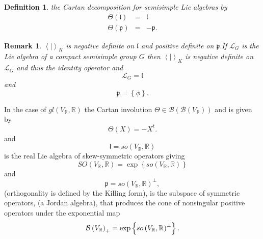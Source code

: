 \documentclass[aps,preprint]{revtex4}
\newtheorem{definition}[theorem]{Definition}
\newtheorem{remark}[theorem]{Remark}
\begin{document}
\begin{definition}
the Cartan decomposition for semisimple Lie algebras by%
\begin{eqnarray}
\Theta \left( \mathfrak{l}\right) &=&\mathfrak{l} \\
\Theta \left( \mathfrak{p}\right) &=&-\mathfrak{p.}
\end{eqnarray}
\end{definition}

\begin{remark}
$\left\langle \left. {}\right\vert \right\rangle _{K}$ is negative definite
on $\mathfrak{l}$ and positive definite on $\mathfrak{p.}$If $\mathcal{L}%
_{G} $ is the Lie algebra of a compact semisimple group $G$ then $%
\left\langle \left. {}\right\vert \right\rangle _{K}$ is negative definite
on $\mathcal{L}_{G}$ and thus the identity operator and 
\begin{equation}
\mathcal{L}_{G}=\mathfrak{l}
\end{equation}%
and 
\begin{equation}
\mathfrak{p}=\left\{ \phi \right\} .
\end{equation}
\end{remark}

In the case of $gl\left( V_{\mathbb{R}},\mathbb{R}\right) $ the Cartan
involution $\Theta \in \mathcal{B}\left( \mathcal{B}\left( V_{\mathbb{R}%
}\right) \right) $ and is given by 
\begin{equation}
\Theta \left( X\right) =-X^{t}.
\end{equation}%
and 
\begin{equation}
\mathfrak{l}=so\left( V_{\mathbb{R}},\mathbb{R}\right)
\end{equation}
is the real Lie algebra of skew-symmetric operators giving 
\begin{equation}
SO\left( V_{\mathbb{R}},\mathbb{R}\right) =\exp \left\{ so\left( V_{\mathbb{R%
}},\mathbb{R}\right) \right\}
\end{equation}%
and%
\begin{equation}
\mathfrak{p}=so\left( V_{\mathbb{R}},\mathbb{R}\right) ^{\bot },
\end{equation}
(orthogonality is defined by the Killing form), is the subspace of symmetric
operators, (a Jordan algebra), that produces the cone of nonsingular
positive operators under the exponential map 
\begin{equation}
\mathcal{B}\left( V_{\mathbb{R}}\right) _{+}=\exp \left\{ so\left( V_{%
\mathbb{R}},\mathbb{R}\right) ^{\bot }\right\} .
\end{equation}
\end{document}
